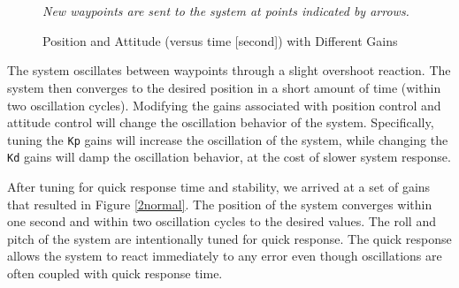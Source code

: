 \documentclass[letter, 10pt]{article}
\begin{document}
\begin{onehalfspacing}
\begin{figure}[t!]
	\centering
	 \\
	\\
	\caption{Position and Attitude (versus time [second]) with Different Gains}
		{\it New waypoints are sent to the system at points indicated by arrows.}
\end{figure}

The system oscillates between waypoints through a slight overshoot reaction.
The system then converges to the desired position in a short amount of time (within two oscillation cycles).
Modifying the gains associated with position control and attitude control
will change the oscillation behavior of the system. Specifically,
tuning the {\tt Kp} gains will increase the oscillation of the system,
while changing the {\tt Kd} gains will damp the oscillation behavior, at the cost of slower system response.

After tuning for quick response time and stability,
we arrived at a set of gains that resulted in Figure \ref{2normal}.
The position of the system converges within one second and within
two oscillation cycles to the desired values. The roll and pitch of the
system are intentionally tuned for quick response. The quick response
allows the system to react immediately to any error even though oscillations
are often coupled with quick response time.


\end{onehalfspacing}
\end{document}
